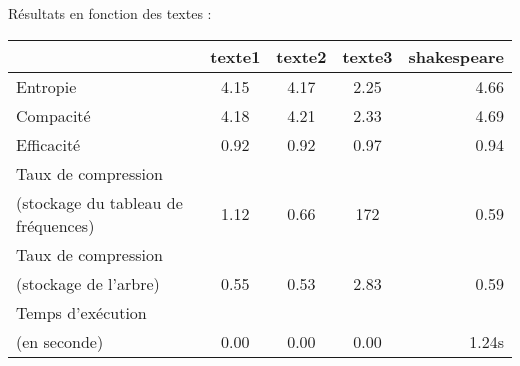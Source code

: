\documentclass[a4paper,11pt]{article}
\begin{document}
\large Résultats en fonction des textes : \\
\begin{tabular}{|l|c|c|c|r|}
\hline
& texte1 & texte2 & texte3 & shakespeare \\
\hline
Entropie & 4.15 & 4.17 & 2.25 & 4.66 \\
\hline
Compacité & 4.18 & 4.21 & 2.33 & 4.69 \\
\hline
Efficacité & 0.92 & 0.92 & 0.97 & 0.94 \\
\hline
Taux de compression & & & & \\
(stockage du tableau de fréquences) & 1.12 & 0.66 & 172 & 0.59 \\
\hline
Taux de compression & & & & \\
(stockage de l'arbre) & 0.55  & 0.53  & 2.83  &  0.59\\
\hline
Temps d'exécution & & & &\\
(en seconde) & 0.00 & 0.00 & 0.00 & 1.24s \\
\hline
\end{tabular}
\end{document}
